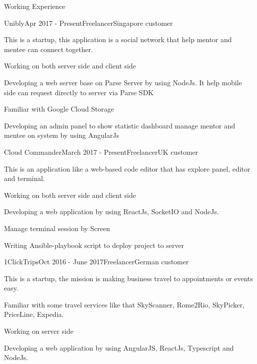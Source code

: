 \documentclass{resume} %
\begin{document}
\begin{rSection}{Working Experience}

\begin{rSubsection}{Unibly}{Apr 2017 - Present}{Freelancer}{Singapore customer}
\item This is a startup, this application is a social network that help mentor and mentee can connect together.
\item Working on both server side and client side
\item Developing a web server base on Parse Server by using NodeJs. It help mobile side can request directly to server via Parse SDK
\item Familiar with Google Cloud Storage
\item Developing an admin panel to show statistic dashboard  manage mentor and mentee on system by using AngularJs
\end{rSubsection}

\begin{rSubsection}{Cloud Commander}{March 2017 - Present}{Freelancer}{UK customer}
\item This is an application like a web-based code editor that has explore panel, editor and terminal.
\item Working on both server side and client side
\item Developing a web application by using ReactJs, SocketIO and NodeJs.
\item Manage terminal session by Screen
\item Writing Ansible-playbook script to deploy project to server
\end{rSubsection}

\begin{rSubsection}{1ClickTrips}{Oct 2016 - June 2017}{Freelancer}{German customer}
\item This is a startup, the mission is making business travel to appointments or events easy.
\item Familiar with some travel services like that SkyScanner, Rome2Rio, SkyPicker, PriceLine, Expedia.
\item Working on server side
\item Developing a web application by using AngularJS, ReactJs, Typescript and NodeJs.
\end{rSubsection}


\end{rSection}
\end{document}
